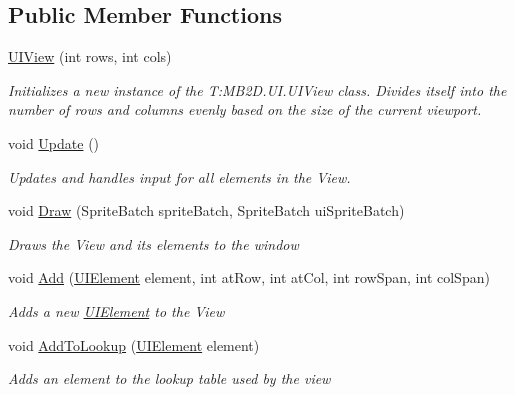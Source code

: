 \subsection*{Public Member Functions}
\begin{DoxyCompactItemize}
\item 
\hyperlink{class_m_b2_d_1_1_u_i_1_1_u_i_view_ad441dede0fc04e04b4137395eaeab376}{U\+I\+View} (int rows, int cols)
\begin{DoxyCompactList}\small\item\em Initializes a new instance of the T\+:\+M\+B2\+D.\+U\+I.\+U\+I\+View class. Divides itself into the number of rows and columns evenly based on the size of the current viewport. \end{DoxyCompactList}\item 
void \hyperlink{class_m_b2_d_1_1_u_i_1_1_u_i_view_a5628b6cd853a0f419eb8ac62958f62bb}{Update} ()
\begin{DoxyCompactList}\small\item\em Updates and handles input for all elements in the View. \end{DoxyCompactList}\item 
void \hyperlink{class_m_b2_d_1_1_u_i_1_1_u_i_view_a1f1acf013f17aa0738ff2d9b0516126e}{Draw} (Sprite\+Batch sprite\+Batch, Sprite\+Batch ui\+Sprite\+Batch)
\begin{DoxyCompactList}\small\item\em Draws the View and its elements to the window \end{DoxyCompactList}\item 
void \hyperlink{class_m_b2_d_1_1_u_i_1_1_u_i_view_a486357124c0a1bc13d1c5909f26a6e2b}{Add} (\hyperlink{class_m_b2_d_1_1_u_i_1_1_u_i_element}{U\+I\+Element} element, int at\+Row, int at\+Col, int row\+Span, int col\+Span)
\begin{DoxyCompactList}\small\item\em Adds a new \hyperlink{class_m_b2_d_1_1_u_i_1_1_u_i_element}{U\+I\+Element} to the View \end{DoxyCompactList}\item 
void \hyperlink{class_m_b2_d_1_1_u_i_1_1_u_i_view_aad1fdbf0c8a8d94cb57fff8b5ff43ec8}{Add\+To\+Lookup} (\hyperlink{class_m_b2_d_1_1_u_i_1_1_u_i_element}{U\+I\+Element} element)
\begin{DoxyCompactList}\small\item\em Adds an element to the lookup table used by the view \end{DoxyCompactList}\end{DoxyCompactItemize}
